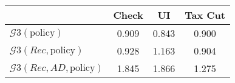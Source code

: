 \begin{tabular}{@{}lccc@{}} 
\toprule 
                          & Check      & UI    & Tax Cut    \\  \midrule 
$\mathcal{G}3(\text{policy})$ & 0.909  & 0.843  & 0.900     \\ 
$\mathcal{G}3(Rec,\text{policy})$ & 0.928  & 1.163  & 0.904     \\ 
$\mathcal{G}3(Rec, AD,\text{policy})$ & 1.845  & 1.866  & 1.275     \\ 
\end{tabular}  
